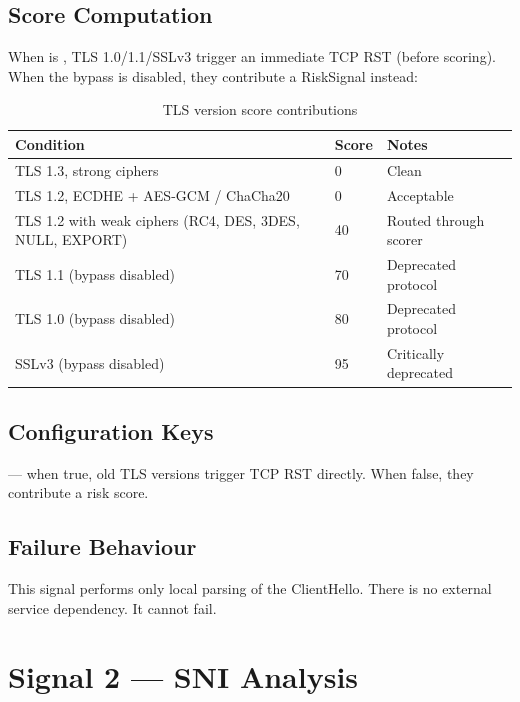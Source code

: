 \subsection{Score Computation}

When  is , TLS
1.0/1.1/SSLv3 trigger an immediate TCP RST (before scoring). When the bypass is disabled,
they contribute a RiskSignal instead:

\begin{fullwidth}
\begin{table}[h]
\caption{TLS version score contributions}
\label{tab:tls-scores}
\begin{tabular}{@{}llp{7cm}@{}}
\toprule
\textbf{Condition} & \textbf{Score} & \textbf{Notes} \\
\midrule
TLS 1.3, strong ciphers & 0 & Clean \\
TLS 1.2, ECDHE + AES-GCM / ChaCha20 & 0 & Acceptable \\
TLS 1.2 with weak ciphers (RC4, DES, 3DES, NULL, EXPORT) & 40 & Routed through scorer \\
TLS 1.1 (bypass disabled) & 70 & Deprecated protocol \\
TLS 1.0 (bypass disabled) & 80 & Deprecated protocol \\
SSLv3 (bypass disabled) & 95 & Critically deprecated \\
\bottomrule
\end{tabular}
\end{table}
\end{fullwidth}

\subsection{Configuration Keys}

 — when true, old TLS versions
trigger TCP RST directly. When false, they contribute a risk score.

\subsection{Failure Behaviour}

This signal performs only local parsing of the ClientHello. There is no external service
dependency. It cannot fail.

\section{Signal 2 — SNI Analysis}
\label{sig:sni}

